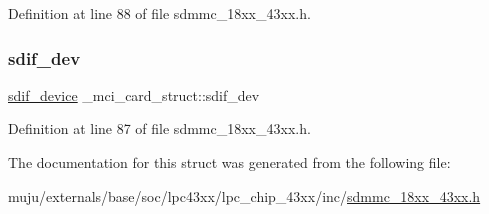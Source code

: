 Definition at line 88 of file sdmmc\+\_\+18xx\+\_\+43xx.\+h.

\mbox{\label{struct__mci__card__struct_a5ab85d4fec588e64d0a726bf45da916e}} 
\subsubsection{\texorpdfstring{sdif\+\_\+dev}{sdif\_dev}}
{\footnotesize\ttfamily \hyperlink{group___s_d_i_f__18_x_x__43_x_x_ga14a605aa797cde1201ae414437a32292}{sdif\+\_\+device} \+\_\+mci\+\_\+card\+\_\+struct\+::sdif\+\_\+dev}



Definition at line 87 of file sdmmc\+\_\+18xx\+\_\+43xx.\+h.



The documentation for this struct was generated from the following file\+:\begin{DoxyCompactItemize}
\item 
muju/externals/base/soc/lpc43xx/lpc\+\_\+chip\+\_\+43xx/inc/\hyperlink{sdmmc__18xx__43xx_8h}{sdmmc\+\_\+18xx\+\_\+43xx.\+h}\end{DoxyCompactItemize}
